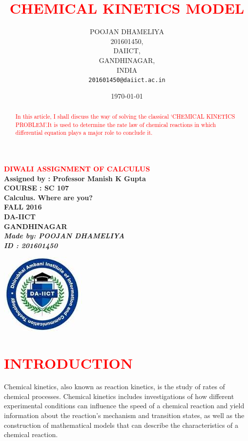 \documentclass[12pt]{article}
\begin{document}
\title{\textcolor{red}{CHEMICAL KINETICS MODEL}}
\begin{center}
\Huge
 {\bf \textcolor{red}{ 
{ DIWALI  ASSIGNMENT OF CALCULUS }       \\
 }
}
\vspace{2 cm}
\Large\bf
{ Assigned by : Professor Manish K Gupta}  \\
\huge\bf { COURSE      : SC 107   \\
  Calculus. Where are you?\\
  FALL 2016    \\
  DA-IICT      \\
  GANDHINAGAR  \\
}
\vspace{5 cm}
\LARGE {\it
{ 
  Made by: POOJAN DHAMELIYA   \\
  ID  : 201601450 \\
}
}
\end{center}
\author{
         POOJAN DHAMELIYA\\
         201601450,\\
         DAIICT,\\
         GANDHINAGAR,\\
         INDIA\\
         \texttt{201601450@daiict.ac.in}
      }  
\date{\today}
\maketitle
\begin{abstract}
\textcolor{red}
{
\large
{
In this article, I shall discuss  the way of solving the classical
 `CHEMICAL KINETICS PROBLEM'.It is used to determine the rate law of chemical reactions in which differential equation plays a major role to conclude it.
}
}
\end{abstract}

  \begin{center}
  \includegraphics[scale=1.0]{201601450}
\end{center}
\newpage
\section{\textcolor{red}{INTRODUCTION}}
\textsf
Chemical kinetics, also known as reaction kinetics, is the study of rates of chemical processes. Chemical kinetics includes investigations of how different experimental conditions can influence the speed of a chemical reaction and yield information about the reaction's mechanism and transition states, as well as the construction of mathematical models that can describe the characteristics of a chemical reaction.
\end{document}
